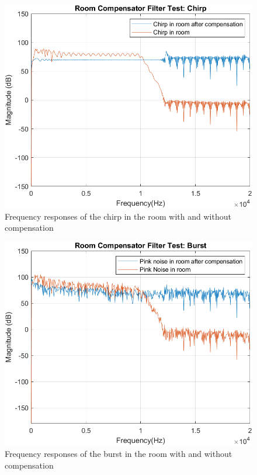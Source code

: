 \documentclass[conference]{IEEEtran}
\begin{document}
        \begin{figure}[H]
            \centering
            \includegraphics[scale = 0.55]{resources/chirpComparison.png}
            \caption{Frequency responses of the chirp in the room with and without compensation}
            \label{chirpComparison}
        \end{figure}
        \begin{figure}[H]
            \centering
            \includegraphics[scale = 0.55]{resources/burstComparison.png}
            \caption{Frequency responses of the burst in the room with and without compensation}
            \label{noiseComparison}
        \end{figure}
\end{document}
